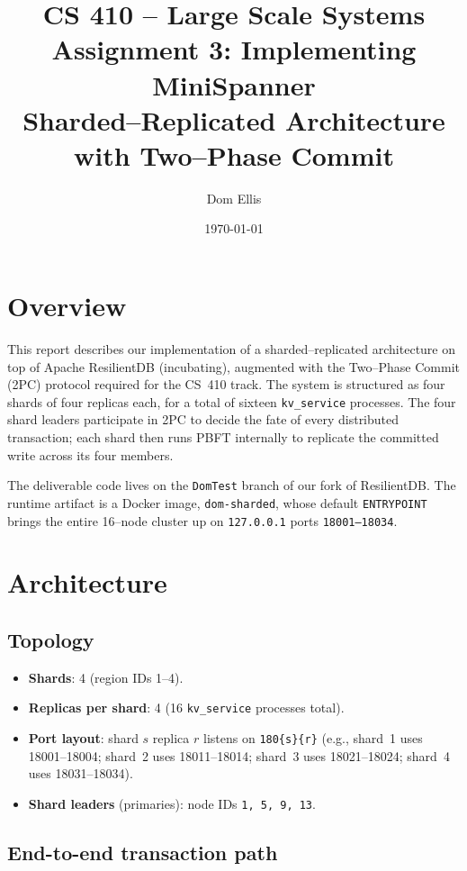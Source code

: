 \documentclass[11pt]{article}
\title{\textbf{CS 410 -- Large Scale Systems}\\Assignment 3: Implementing MiniSpanner\\Sharded--Replicated Architecture with Two--Phase Commit}
\author{Dom Ellis}
\date{\today}
\begin{document}
\maketitle

\section{Overview}

This report describes our implementation of a sharded--replicated architecture
on top of Apache ResilientDB (incubating), augmented with the Two--Phase
Commit (2PC) protocol required for the CS~410 track. The system is structured
as four shards of four replicas each, for a total of sixteen
\texttt{kv\_service} processes. The four shard leaders participate in 2PC to
decide the fate of every distributed transaction; each shard then runs PBFT
internally to replicate the committed write across its four members.

The deliverable code lives on the \texttt{DomTest} branch of our fork of
ResilientDB. The runtime artifact is a Docker image, \texttt{dom-sharded},
whose default \texttt{ENTRYPOINT} brings the entire 16--node cluster up on
\texttt{127.0.0.1} ports \texttt{18001--18034}.

\section{Architecture}

\subsection{Topology}
\begin{itemize}[itemsep=2pt]
  \item \textbf{Shards}: 4 (region IDs 1--4).
  \item \textbf{Replicas per shard}: 4 (16 \texttt{kv\_service} processes total).
  \item \textbf{Port layout}: shard $s$ replica $r$ listens on
        \texttt{180\{s\}\{r\}} (e.g., shard~1 uses 18001--18004; shard~2 uses
        18011--18014; shard~3 uses 18021--18024; shard~4 uses 18031--18034).
  \item \textbf{Shard leaders} (primaries): node IDs \texttt{1, 5, 9, 13}.
\end{itemize}

\subsection{End-to-end transaction path}
\end{document}
